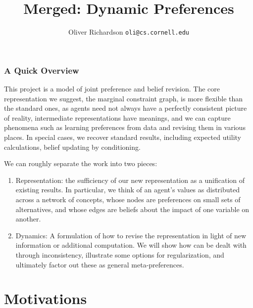 \documentclass{article}
\title{Merged: Dynamic Preferences}
\author{Oliver Richardson  \texttt{oli@cs.cornell.edu}}
\begin{document}
	\maketitle
	

	\section*{A Quick Overview}
	This project is a model of joint preference and belief revision. The core representation we suggest, the marginal constraint graph, is more flexible than the standard ones, as agents need not always have a perfectly consistent picture of reality, intermediate representations have meanings, and we can capture phenomena such as learning preferences from data and revising them in various places. In special cases, we recover standard results, including expected utility calculations, belief updating by conditioning.
	
	We can roughly separate the work into two pieces:
	\begin{enumerate}%
		\item Representation: the sufficiency of our new representation as a unification of existing results. In particular, we think of an agent's values as distributed across a network of concepts, whose nodes are preferences on small sets of alternatives, and whose edges are beliefs about the impact of one variable on another.
		\item Dynamics: A formulation of how to revise the representation in light of new information or additional computation. We will show how can be dealt with through inconsistency, illustrate some options for regularization, and ultimately factor out these as general meta-preferences. 
	\end{enumerate}
	
	\part{Motivations}
\end{document}
